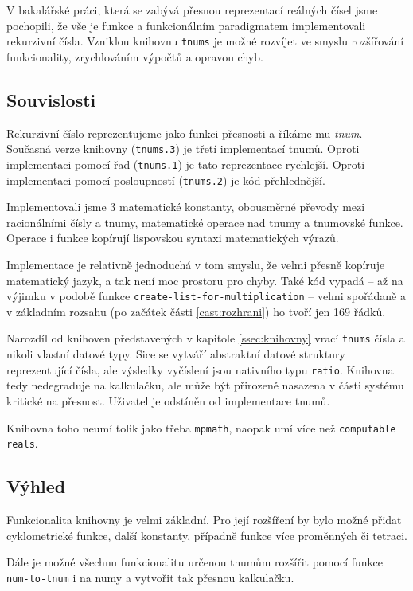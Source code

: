 V bakalářské práci, která se zabývá přesnou reprezentací reálných čísel jsme pochopili, že vše je funkce a funkcionálním paradigmatem implementovali rekurzivní čísla. Vzniklou knihovnu \texttt{tnums} je možné rozvíjet ve smyslu rozšířování funkcionality, zrychlováním výpočtů a opravou chyb.

\subsection{Souvislosti}
Rekurzivní číslo reprezentujeme jako funkci přesnosti a říkáme mu \textit{tnum}. Současná verze knihovny (\texttt{tnums.3}) je třetí implementací tnumů. Oproti implementaci pomocí řad (\texttt{tnums.1}) je tato reprezentace rychlejší. Oproti implementaci pomocí posloupností (\texttt{tnums.2}) je kód přehlednější.

Implementovali jsme 3 matematické konstanty, obousměrné převody mezi racionálními čísly a tnumy, matematické operace nad tnumy a tnumovské funkce. Operace i funkce kopírují lispovskou syntaxi matematických výrazů.

Implementace je relativně jednoduchá v tom smyslu, že velmi přesně kopíruje matematický jazyk, a tak není moc prostoru pro chyby. Také kód vypadá -- až na výjimku v podobě funkce \texttt{create-list-for-multiplication} -- velmi spořádaně a v základním rozsahu (po začátek části \ref{cast:rozhrani}) ho tvoří jen 169 řádků.

Narozdíl od knihoven představených v kapitole \ref{ssec:knihovny} vrací \texttt{tnums} čísla a nikoli vlastní datové typy. Sice se vytváří abstraktní datové struktury reprezentující čísla, ale výsledky vyčíslení jsou nativního typu \texttt{ratio}. Knihovna tedy nedegraduje na kalkulačku, ale může být přirozeně nasazena v části systému kritické na přesnost. Uživatel je odstíněn od implementace tnumů.

Knihovna toho neumí tolik jako třeba \texttt{mpmath}, naopak umí více než \texttt{computable reals}.

\subsection{Výhled}
Funkcionalita knihovny je velmi základní. Pro její rozšíření by bylo možné přidat cyklometrické funkce, další konstanty, případně funkce více proměnných či tetraci.

Dále je možné všechnu funkcionalitu určenou tnumům rozšířit pomocí funkce \texttt{num-to-tnum} i na numy a vytvořit tak přesnou kalkulačku.

